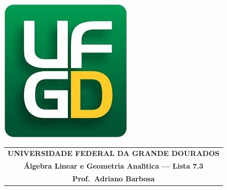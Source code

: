 \documentclass[a4paper,5pt]{amsbook}
\begin{document}
\thispagestyle{empty}
\pagestyle{empty}
\begin{minipage}[h]{0.14\textwidth}
	\includegraphics[scale=0.24]{../../ufgd.png}
\end{minipage}
\begin{minipage}[h]{\textwidth}
\begin{tabular}{c}
{{\bf UNIVERSIDADE FEDERAL DA GRANDE DOURADOS}}\\
{{\bf \'{A}lgebra Linear e Geometria Anal\'{\i}tica --- Lista 7.3}}\\
{{\bf Prof.\ Adriano Barbosa}}\\
\end{tabular}
\vspace{-0.45cm}
%
\end{minipage}

\end{document}
